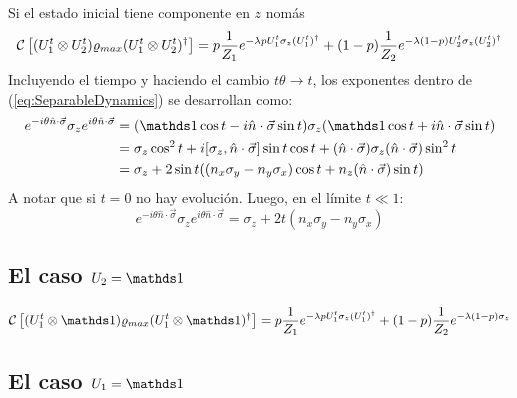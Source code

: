 Si el estado inicial tiene componente en $z$ nomás
\begin{equation}\label{eq:SeparableDynamics}
\mathcal{C}\left[(U_{1}^{t}\otimes U_{2}^{t})\varrho_{max}(U_{1}^{t}\otimes U_{2}^{t})^{\dag}\right]=p\frac{1}{Z_{1}}e^{-\lambda p U_{1}^{t}\sigma_{z}(U_{1}^t)^{\dag}}+(1-p)\frac{1}{Z_{2}}e^{-\lambda (1-p)U_{2}^{t}\sigma_{z}(U_{2}^t)^{\dag}}
\end{equation}
Incluyendo el tiempo y haciendo el cambio $t\theta\rightarrow t$, los exponentes dentro de (\ref{eq:SeparableDynamics}) se desarrollan como:
\begin{align*}
    e^{-i\theta \hat{n}\cdot\vec{\sigma}}\sigma_{z}e^{i\theta \hat{n}\cdot\vec{\sigma}}&=(\Id\cos{t}-i\hat{n}\cdot\vec{\sigma}\sin{t})\sigma_{z}(\Id\cos{t}+i\hat{n}\cdot\vec{\sigma}\sin{t})\\
    &=\sigma_{z}\cos^{2}{t}+i[\sigma_{z},\hat{n}\cdot\vec{\sigma}]\sin{t}\cos{t}+(\hat{n}\cdot\vec{\sigma})\sigma_{z}(\hat{n}\cdot\vec{\sigma})\sin^{2}{t}\\
    &=\sigma_{z}+2\sin{t}\qty((n_{x}\sigma_{y}-n_{y}\sigma_{x})\cos{t}+n_{z}(\hat{n}\cdot\vec{\sigma})\sin{t})
\end{align*}
A notar que si $t=0$ no hay evolución. Luego, en el límite $t\ll 1$:
\begin{equation*}
    e^{-i\theta \hat{n}\cdot\vec{\sigma}}\sigma_{z}e^{i\theta \hat{n}\cdot\vec{\sigma}}=\sigma_{z}+2t(n_{x}\sigma_{y}-n_{y}\sigma_{x})
\end{equation*}

\subsection{El caso $U_{2}=\Id$}

\begin{equation}\label{eq:SeparableDynamicsUxI}
\CG{(U_{1}^{t}\otimes \Id)\varrho_{max}(U_{1}^{t}\otimes \Id)^{\dag}}=p\frac{1}{Z_{1}}e^{-\lambda p U_{1}^{t}\sigma_{z}(U_{1}^t)^{\dag}}+(1-p)\frac{1}{Z_{2}}e^{-\lambda (1-p)\sigma_{z}}
\end{equation}

\subsection{El caso $U_{1}=\Id$}

